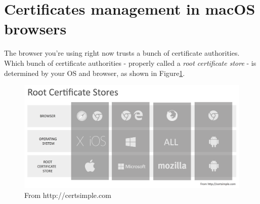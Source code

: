 \documentclass[11pt]{article}
\begin{document}
\section{Certificates management in macOS browsers}
The browser you're using right now trusts a bunch of certificate authorities. Which bunch of certificate authorities - properly called a \textit{root certificate store} - is determined by your OS and browser, as shown in Figure\ref{fig:rootstores}.

\begin{figure}[h]
\includegraphics[width=1.0\textwidth]{rootstores-hw5-1642557}
\centering
\caption{From http://certsimple.com}
\label{fig:rootstores}
\end{figure}
\end{document}
